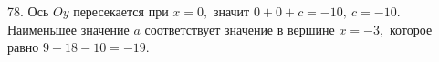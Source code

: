 78. Ось $Oy$ пересекается при $x=0,$ значит $0+0+c=-10,\ c=-10.$ Наименьшее значение $a$ соответствует значение в вершине $x=-3,$ которое равно $9-18-10=-19.$\\
